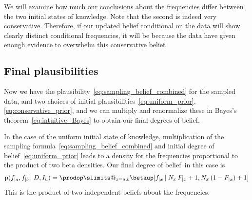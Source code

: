 \documentclass[\ifafour a4paper,12pt,\else a5paper,10pt,\fi%
onecolumn,oneside,article,%
british%
]{memoir}
\makeatletter
\theoremstyle{remark}
\theoremstyle{innote}
\def\prod{\DOTSI\prodop\slimits@}
\newcommand*{\pf}{\mathrm{p}}%
\renewcommand*{\|}[1][]{\nonscript\,#1\vert\nonscript\;\mathopen{}}
\newcommand*{\dob}{degree of belief}
\newcommand*{\dobs}{degrees of belief}
\newcommand*{\yD}{D}
\newcommand*{\yI}{I}
\newcommand*{\yIu}{\yI_\text{u}}
\newcommand*{\ya}{a}
\newcommand*{\yb}{b}
\newcommand*{\dbeta}{\betaup}
\makeatother
\begin{document}
\medskip

We will examine how much our conclusions about the frequencies differ
between the two initial states of knowledge. Note that the second is indeed
very conservative. Therefore, if our updated belief conditional on the data
will show clearly distinct conditional frequencies, it will be because the
data have given enough evidence to overwhelm this conservative belief.


\subsection{Final plausibilities}
\label{sec:p_final}

Now we have the plausibility~\eqref{eq:sampling_belief_combined} for the
sampled data, and two choices of initial
plausibilities~\eqref{eq:uniform_prior}, \eqref{eq:conservative_prior}, and
we can multiply and renormalize these in Bayes's
theorem~\eqref{eq:intuitive_Bayes} to obtain our final \dobs.

In the case of the uniform initial state of knowledge, multiplication of
the sampling formula~\eqref{eq:sampling_belief_combined} and initial
\dob~\eqref{eq:uniform_prior} leads to a density for the frequencies
proportional to the product of two beta densities. Our final \dob\ in this
case is
\begin{equation}
  \label{eq:final_from_uniform}
  \pf(f_{|\ya}, f_{|\yb} \| \yD, \yIu)
  =
\prod_{x=\ya,\yb}
\dbeta[f_{|x} \| N_{x}\,F_{|x}+1, N_{x}\,(1-F_{|x})+1]
\end{equation}
This is the product of two independent beliefs about the frequencies.
\end{document}
